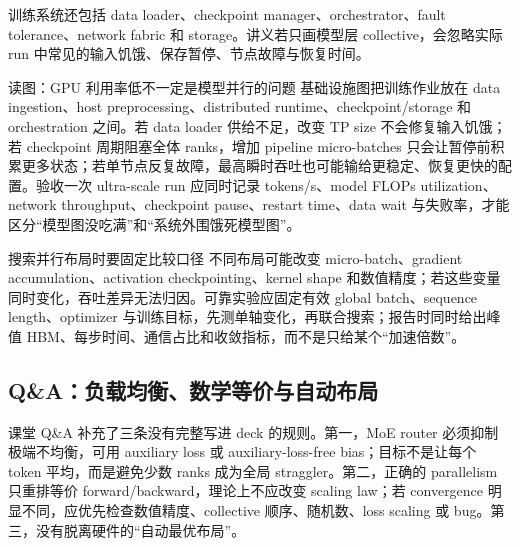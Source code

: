 训练系统还包括 data loader、checkpoint manager、orchestrator、fault tolerance、network fabric 和 storage。讲义若只画模型层 collective，会忽略实际 run 中常见的输入饥饿、保存暂停、节点故障与恢复时间。


\begin{knowledgebox}{读图：GPU 利用率低不一定是模型并行的问题}
基础设施图把训练作业放在 data ingestion、host preprocessing、distributed runtime、checkpoint/storage 和 orchestration 之间。若 data loader 供给不足，改变 TP size 不会修复输入饥饿；若 checkpoint 周期阻塞全体 ranks，增加 pipeline micro-batches 只会让暂停前积累更多状态；若单节点反复故障，最高瞬时吞吐也可能输给更稳定、恢复更快的配置。验收一次 ultra-scale run 应同时记录 tokens/s、model FLOPs utilization、network throughput、checkpoint pause、restart time、data wait 与失败率，才能区分“模型图没吃满”和“系统外围饿死模型图”。
\end{knowledgebox}

\begin{warningbox}{搜索并行布局时要固定比较口径}
不同布局可能改变 micro-batch、gradient accumulation、activation checkpointing、kernel shape 和数值精度；若这些变量同时变化，吞吐差异无法归因。可靠实验应固定有效 global batch、sequence length、optimizer 与训练目标，先测单轴变化，再联合搜索；报告时同时给出峰值 HBM、每步时间、通信占比和收敛指标，而不是只给某个“加速倍数”。
\end{warningbox}

\subsection{Q\&A：负载均衡、数学等价与自动布局}

课堂 Q\&A 补充了三条没有完整写进 deck 的规则。第一，MoE router 必须抑制极端不均衡，可用 auxiliary loss 或 auxiliary-loss-free bias；目标不是让每个 token 平均，而是避免少数 ranks 成为全局 straggler。第二，正确的 parallelism 只重排等价 forward/backward，理论上不应改变 scaling law；若 convergence 明显不同，应优先检查数值精度、collective 顺序、随机数、loss scaling 或 bug。第三，没有脱离硬件的“自动最优布局”。



